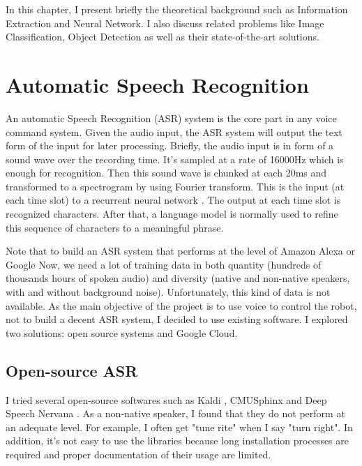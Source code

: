 In this chapter, I present briefly the theoretical background such as Information Extraction and Neural Network. I also discuss related problems like Image Classification, Object Detection as well as their state-of-the-art solutions.

\section{Automatic Speech Recognition}
An automatic Speech Recognition (ASR) system is the core part in any voice command system. Given the audio input, the ASR system will output the text form of the input for later processing. Briefly, the audio input is in form of a sound wave over the recording time. It's sampled at a rate of 16000Hz which is enough for recognition. Then this sound wave is chunked at each 20ms and transformed to a spectrogram by using Fourier transform. This is the input (at each time slot) to a recurrent neural network \cite{Medium:2016}. The output at each time slot is recognized characters. After that, a language model is normally used to refine this sequence of characters to a meaningful phrase. 

Note that to build an ASR system that performs at the level of Amazon Alexa or Google Now, we need a lot of training data in both quantity (hundreds of thousands hours of spoken audio) and diversity (native and non-native speakers, with and without background noise). Unfortunately, this kind of data is not available. As the main objective of the project is to use voice to control the robot, not to build a decent ASR system, I decided to use existing software. I explored two solutions: open source systems and Google Cloud.

\subsection{Open-source ASR}
I tried several open-source softwares such as Kaldi \cite{Kaldi:2017}, CMUSphinx \cite{CMUSphinx:2017} and Deep Speech Nervana \cite{DeepSpeech:2017}. As a non-native speaker, I found that they do not perform at an adequate level. For example, I often get "tune rite" when I say "turn right". In addition, it's not easy to use the libraries because long installation processes are required and proper documentation of their usage are limited.

